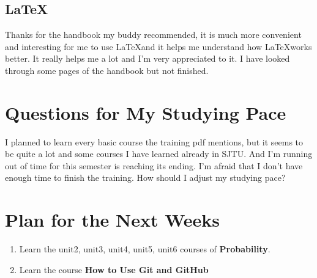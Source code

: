 \documentclass{article}
\begin{document}
 \subsection{\LaTeX}

 Thanks for the handbook my buddy recommended, it is much more convenient and interesting for me to use \LaTeX and it helps me understand how \LaTeX works better. It really helps me a lot and I'm very appreciated to it. I have looked through some pages of the handbook but not finished.

\section{Questions for My Studying Pace}

I planned to learn every basic course the training pdf mentions, but it seems to be quite a lot and some courses I have learned already in SJTU. And I'm running out of time for this semester is reaching its ending. I'm afraid that I don't have enough time to finish the training. How should I adjust my studying pace?
\section{Plan for the Next Weeks}

\begin{enumerate}
\item
Learn the unit2, unit3, unit4, unit5, unit6 courses of \textbf{Probability}.
\item
Learn the course \textbf{How to Use Git and GitHub}
\end{enumerate}
\end{document}
